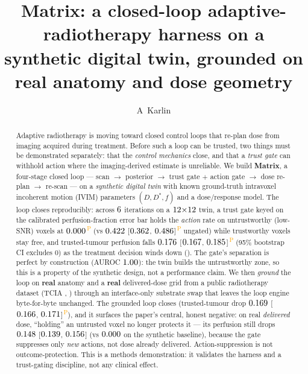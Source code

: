 \documentclass[12pt]{iopart}
\newcommand{\PROV}{\textsuperscript{\textcolor{orange}{\,P}}}
\newcommand{\Dstar}{D^{*}}
\newcommand{\fq}{f}          %
\begin{document}
\title[Matrix: a closed-loop adaptive-RT harness on a synthetic twin]{Matrix: a
closed-loop adaptive-radiotherapy harness on a synthetic digital twin, grounded on real
anatomy and dose geometry}

\author{A~Karlin}
\address{\textit{Affiliation to be confirmed} \texttt{[TODO-AUTHORS]}}


\begin{abstract}
\noindent
Adaptive radiotherapy is moving toward closed control loops that re-plan dose from
imaging acquired during treatment. Before such a loop can be trusted, two things must
be demonstrated separately: that the \emph{control mechanics} close, and that a
\emph{trust gate} can withhold action where the imaging-derived estimate is unreliable.
We build \textbf{Matrix}, a four-stage closed loop --- scan $\rightarrow$ posterior
$\rightarrow$ trust gate $+$ action gate $\rightarrow$ dose re-plan $\rightarrow$
re-scan --- on a \emph{synthetic digital twin} with known ground-truth intravoxel
incoherent motion (IVIM) parameters $(D,\Dstar,\fq)$ and a dose/response model. The
loop closes reproducibly: across $6$ iterations on a $12{\times}12$
twin, a trust gate keyed on the calibrated perfusion-fraction error bar holds the
\emph{action} rate on untrustworthy (low-SNR) voxels at $0.000$\PROV{} (vs
$0.422$ [$0.362$, $0.486$]\PROV{} ungated) while
trustworthy voxels stay free, and trusted-tumour perfusion falls $0.176$
[$0.167$, $0.185$]\PROV{} (95\% bootstrap CI excludes 0) as the
treatment decision winds down (\numTreatTraj). The gate's separation is perfect by
construction (AUROC $1.00$): the twin builds the untrustworthy zone, so this is a
property of the synthetic design, not a performance claim. We then \emph{ground} the
loop on \textbf{real} anatomy and a \textbf{real} delivered-dose grid from a public
radiotherapy dataset (TCIA \numFerryDataset, \numFerryLicense) through an
interface-only substrate swap that leaves the loop engine byte-for-byte unchanged.
The grounded loop closes (trusted-tumour drop $0.169$
[$0.166$, $0.171$]\PROV{}), and it surfaces the paper's central,
honest negative: on real \emph{delivered} dose, ``holding'' an untrusted voxel no longer
protects it --- its perfusion still drops $0.148$ [$0.139$,
$0.156$] (vs $0.000$ on the synthetic baseline), because the gate
suppresses only \emph{new} actions, not dose already delivered. Action-suppression is
not outcome-protection. This is a methods demonstration: it validates the harness and a
trust-gating discipline, not any clinical effect.
\end{abstract}
\end{document}
